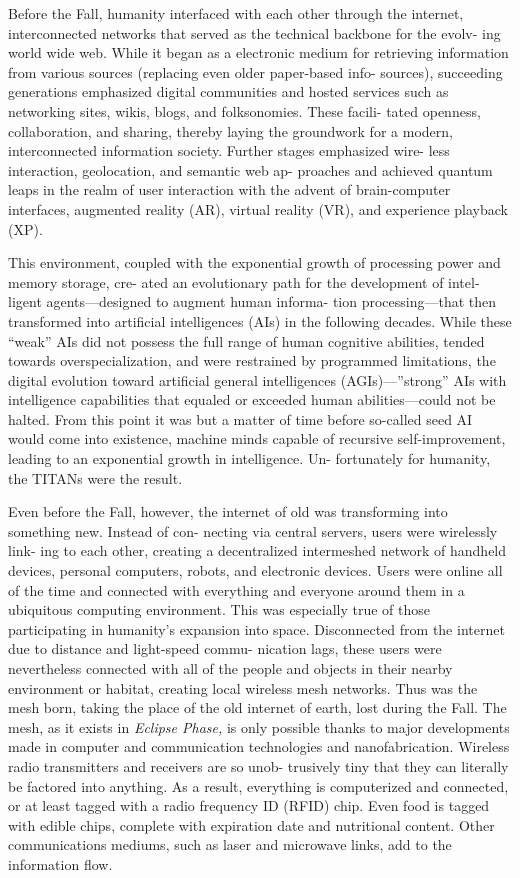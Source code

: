 Before the Fall, humanity interfaced with each other 
through the internet, interconnected networks that 
served as the technical backbone for the evolv-
ing world wide web. While it began as a electronic 
medium for retrieving information from various 
sources (replacing even older paper-based info-
sources), succeeding generations emphasized digital 
communities and hosted services such as networking 
sites, wikis, blogs, and folksonomies. These facili-
tated openness, collaboration, and sharing, thereby 
laying the groundwork for a modern, interconnected 
information society. Further stages emphasized wire-
less interaction, geolocation, and semantic web ap-
proaches and achieved quantum leaps in the realm 
of user interaction with the advent of brain-computer 
interfaces, augmented reality (AR), virtual reality 
(VR), and experience playback (XP).

This environment, coupled with the exponential 
growth of processing power and memory storage, cre-
ated an evolutionary path for the development of intel-
ligent agents—designed to augment human informa-
tion processing—that then transformed into artificial 
intelligences (AIs) in the following decades. While these 
``weak'' AIs did not possess the full range of human 
cognitive abilities, tended towards overspecialization, 
and were restrained by programmed limitations, the 
digital evolution toward artificial general intelligences 
(AGIs)—''strong'' AIs with intelligence capabilities 
that equaled or exceeded human abilities—could not 
be halted. From this point it was but a matter of time 
before so-called seed AI would come into existence, 
machine minds capable of recursive self-improvement, 
leading to an exponential growth in intelligence. Un-
fortunately for humanity, the TITANs were the result.

Even before the Fall, however, the internet of old 
was transforming into something new. Instead of con-
necting via central servers, users were wirelessly link-
ing to each other, creating a decentralized intermeshed 
network of handheld devices, personal computers, 
robots, and electronic devices. Users were online all of 
the time and connected with everything and everyone 
around them in a ubiquitous computing environment. 
This was especially true of those participating in 
humanity's expansion into space. Disconnected from 
the internet due to distance and light-speed commu-
nication lags, these users were nevertheless connected 
with all of the people and objects in their nearby 
environment or habitat, creating local wireless mesh 
networks. Thus was the mesh born, taking the place 
of the old internet of earth, lost during the Fall.
The mesh, as it exists in \textit{Eclipse Phase,} is only possible 
thanks to major developments made in computer and 
communication technologies and nanofabrication. 
Wireless radio transmitters and receivers are so unob-
trusively tiny that they can literally be factored into 
anything. As a result, everything is computerized and 
connected, or at least tagged with a radio frequency 
ID (RFID) chip. Even food is tagged with edible chips, 
complete with expiration date and nutritional content. 
Other communications mediums, such as laser and 
microwave links, add to the information flow.

